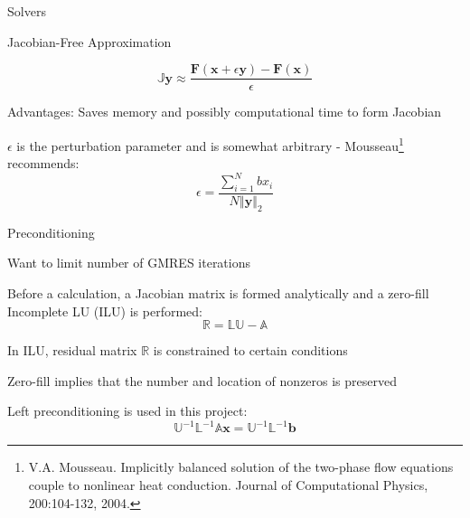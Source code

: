 \documentclass{beamer}
\begin{document}
\begin{section}{Solvers}
\begin{frame}{Jacobian-Free Approximation}
\begin{customlist}{2ex}{0pt}
  \[
   \mathbb{J}\mathbf{y}\approx\frac{\mathbf{F}\left(\mathbf{x}+\epsilon\mathbf{y}\right)-\mathbf{F}\left(\mathbf{x}\right)}{\epsilon}
  \]
  \vfill\item Advantages: Saves memory and possibly computational time to form Jacobian
  \vfill\item $\epsilon$ is the perturbation parameter and is somewhat arbitrary - Mousseau\footnote{V.A. Mousseau. Implicitly balanced solution of the two-phase flow equations couple to nonlinear heat
    conduction. Journal of Computational Physics, 200:104-132, 2004.} recommends:
  \[
   \epsilon=\frac{\sum_{i=1}^{N}bx_{i}}{N\left\Vert \mathbf{y}\right\Vert _{2}}
  \]
\end{customlist}
\end{frame}
\begin{frame}{Preconditioning}
\begin{customlist}{2ex}{0pt}
  \item Want to limit number of GMRES iterations
  \vfill\item Before a calculation, a Jacobian matrix is formed analytically and a zero-fill Incomplete LU (ILU) is performed:
  \[
   \mathbb{R}=\mathbb{L}\mathbb{U}-\mathbb{A}
  \]
  \vfill\item In ILU, residual matrix $\mathbb{R}$ is constrained to certain conditions
  \vfill\item Zero-fill implies that the number and location of nonzeros is preserved
  \vfill\item Left preconditioning is used in this project:
  \[
   \mathbb{U}^{-1}\mathbb{L}^{-1}\mathbb{A}\mathbf{x}=\mathbb{U}^{-1}\mathbb{L}^{-1}\mathbf{b}
  \]
\end{customlist}
\end{frame}
\end{section}
\end{document}

